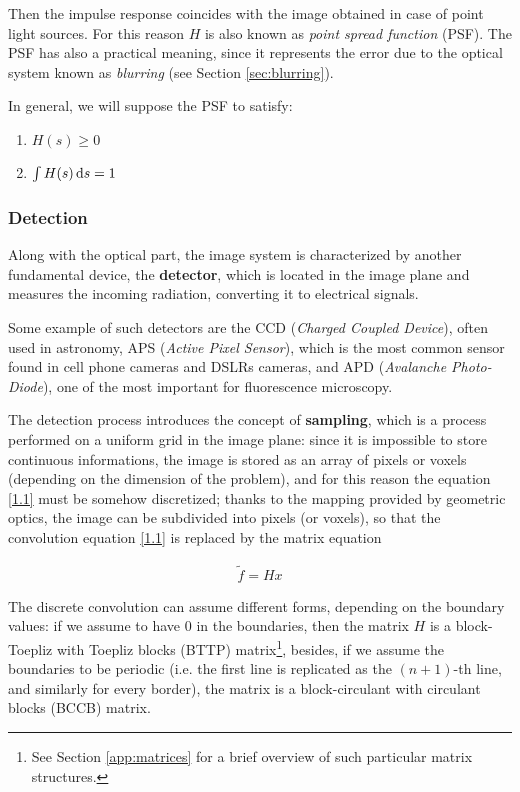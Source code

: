 Then the impulse response coincides with the image obtained in case of point light sources. For this reason $H$ is also known as \emph{point spread function} (PSF). The PSF has also a practical meaning, since it represents the error due to the optical system known as \emph{blurring} (see Section \eqref{sec:blurring}).

In general, we will suppose the PSF to satisfy:

\begin{enumerate}
\item $H(s) \geq 0$
\item $\int H(s) \, \mathrm{d} s = 1$
\end{enumerate}

\subsubsection{Detection}

Along with the optical part, the image system is characterized by another fundamental device, the \textbf{detector}, which is located in the image plane and measures the incoming radiation, converting it to electrical signals.

Some example of such detectors are the CCD (\emph{Charged Coupled Device}), often used in astronomy, APS (\emph{Active Pixel Sensor}), which is the most common sensor found in cell phone cameras and DSLRs cameras, and APD (\emph{Avalanche Photo-Diode}), one of the most important for fluorescence microscopy.

The detection process introduces the concept of \textbf{sampling}, which is a process performed on a uniform grid in the image plane: since it is impossible to store continuous informations, the image is stored as an array of pixels or voxels (depending on the dimension of the problem), and for this reason the equation \eqref{1.1} must be somehow discretized; thanks to the mapping provided by geometric optics, the image can be subdivided into pixels (or voxels), so that the convolution equation \eqref{1.1} is replaced by the matrix equation

\begin{align}
\label{1.2} \tilde{f}=Hx
\end{align}

The discrete convolution can assume different forms, depending on the boundary values: if we assume to have 0 in the boundaries, then the matrix $H$ is a block-Toepliz with Toepliz blocks (BTTP) matrix\footnote{See Section \ref{app:matrices} for a brief overview of such particular matrix structures.}, besides, if we assume the boundaries to be periodic (i.e. the first line is replicated as the $(n+1)$-th line, and similarly for every border), the matrix is a block-circulant with circulant blocks (BCCB) matrix\footnotemark[\value{footnote}].

